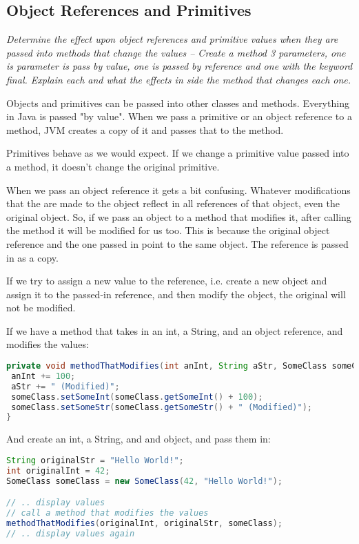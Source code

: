 \subsection{Object References and Primitives}
\textit{Determine the effect upon object references and primitive values when they are passed  into methods that change the values -- Create a method 3 parameters, one is parameter is pass by value, one is passed by reference and one with the keyword final.  Explain each and what the effects in side the method that changes each one.
}

Objects and primitives can be passed into other classes and methods. Everything in Java is passed "by value". When we pass a primitive or an object reference to a method, JVM creates a copy of it and passes that to the method.

Primitives behave as we would expect. If we change a primitive value passed into a method, it doesn't change the original primitive.

When we pass an object reference it gets a bit confusing. Whatever modifications that the are made to the object reflect in all references of that object, even the original object. So, if we pass an object to a method that modifies it, after calling the method it will be modified for us too. This is because the original object reference and the one passed in point to the same object. The reference is passed in as a copy.

If we try to assign a new value to the reference, i.e. create a new object and assign it to the passed-in reference, and then modify the object, the original will not be modified.\cite{referenceorvalue}

If we have a method that takes in an int, a String, and an object reference, and modifies the values:
\begin{lstlisting}[language=Java]
private void methodThatModifies(int anInt, String aStr, SomeClass someClass) {
 anInt += 100;
 aStr += " (Modified)";
 someClass.setSomeInt(someClass.getSomeInt() + 100);
 someClass.setSomeStr(someClass.getSomeStr() + " (Modified)");
}
\end{lstlisting}

And create an int, a String, and and object, and pass them in:

\begin{lstlisting}[language=Java]
String originalStr = "Hello World!";
int originalInt = 42;
SomeClass someClass = new SomeClass(42, "Hello World!");

// .. display values
// call a method that modifies the values
methodThatModifies(originalInt, originalStr, someClass);
// .. display values again
\end{lstlisting}

